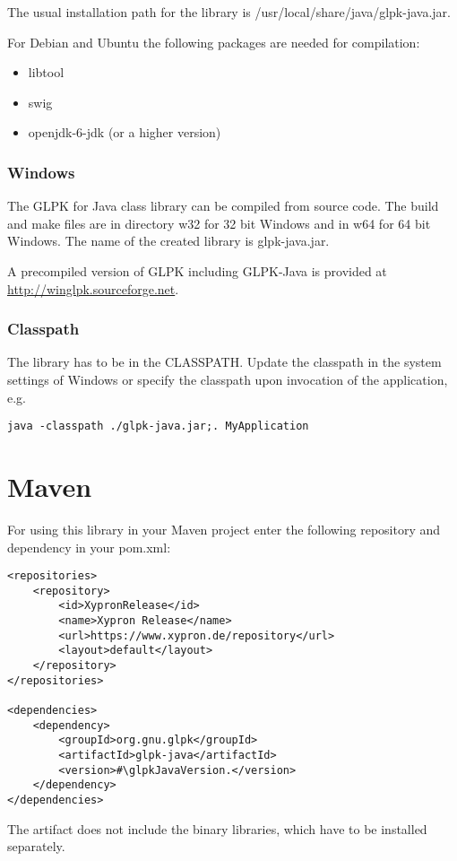 \documentclass[a4paper,11pt]{report}
\newcommand{\glpkJavaVersion}{1.10.0}
\begin{document}
The usual installation path for the library is /usr/local/share/java/glpk-java.jar.

For Debian and Ubuntu the following packages are needed for compilation:
\begin{itemize}
	\item libtool
	\item swig
	\item openjdk-6-jdk (or a higher version)
\end{itemize}
\subsection{Windows}
The GLPK for Java class library can be compiled from source code. The build and make files are in directory w32 for 32 bit Windows and in w64 for 64 bit Windows. The name of the created library is glpk-java.jar.

A precompiled version of GLPK including GLPK-Java is provided at \linebreak\href{http://winglpk.sourceforge.net}{http://winglpk.sourceforge.net}.

\subsection{Classpath}
The library has to be in the CLASSPATH. Update the classpath in the system settings of Windows or specify the classpath upon invocation of the application, e.g.
\begin{verbatim}
java -classpath ./glpk-java.jar;. MyApplication
\end{verbatim}
\chapter{Maven}
For using this library in your Maven project enter the following repository and dependency in your pom.xml:
\begin{lstlisting}
<repositories>
    <repository>
        <id>XypronRelease</id>
        <name>Xypron Release</name>
        <url>https://www.xypron.de/repository</url>
        <layout>default</layout>
    </repository>
</repositories>

<dependencies>
    <dependency>
        <groupId>org.gnu.glpk</groupId>
        <artifactId>glpk-java</artifactId>
        <version>#\glpkJavaVersion.</version>
    </dependency>
</dependencies>
\end{lstlisting}
The artifact does not include the binary libraries, which have to be installed separately.
\end{document}
